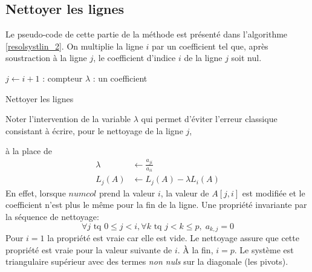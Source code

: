 \subsection{Nettoyer les lignes}
Le pseudo-code de cette partie de la méthode est présenté dans l'algorithme \ref{resolsystlin_2}. On multiplie la ligne $i$ par un coefficient tel que, après soustraction à la ligne $j$, le coefficient d'indice $i$ de la ligne $j$ soit nul.

\begin{algorithm}[h]
  $j\leftarrow i+1$ : compteur\;
  $\lambda$ : un coefficient \;
  \caption{Nettoyer les lignes}
  \label{resolsystlin_2}
\end{algorithm}

Noter l'intervention de la variable $\lambda$ qui permet d'éviter l'erreur classique consistant à écrire, pour le nettoyage de la ligne $j$,

\begin{algorithm}[h]
\end{algorithm}

à la place de
\begin{align*}
    \lambda &\leftarrow \frac{a_{j i}}{a_{i i}}\\
    L_j(A)  &\leftarrow L_j(A)-\lambda L_i(A)  
\end{align*}
En effet, lorsque $numcol$ prend la valeur $i$, la valeur de $A[j,i]$ est modifiée et le coefficient n'est plus le même pour la fin de la ligne.\newline
Une propriété invariante par la séquence de nettoyage:
\begin{displaymath}
  \forall j \text{ tq } 0\leq j < i, \forall k\text{ tq } j<k\leq p, \; a_{k,j} = 0
\end{displaymath}
Pour $i=1$ la propriété est vraie car elle est vide.\newline
Le nettoyage assure que cette propriété est vraie pour la valeur suivante de $i$.\newline
\`A la fin, $i=p$. Le système est triangulaire supérieur avec des termes \emph{non nuls} sur la diagonale (les pivots).

